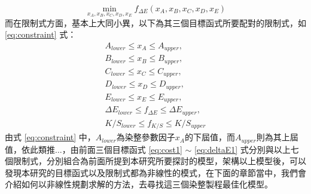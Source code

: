 \begin{equation}
	\min_{x_A,x_B,x_C,x_D,x_E} f_{\Delta E}(x_A,x_B,x_C,x_D,x_E)
\label{eq:deltaE1}
\end{equation}
而在限制式方面，基本上大同小異，以下為其三個目標函式所要配對的限制式，如 \ref{eq:constraint} 式：
\begin{equation}
	\begin{array}{c}
	A_{lower} \leq x_A \leq A_{upper},\\
	B_{lower} \leq x_B \leq B_{upper},\\
	C_{lower} \leq x_C \leq C_{upper},\\
	D_{lower} \leq x_D \leq D_{upper},\\
	E_{lower} \leq x_E \leq E_{upper},\\
	\Delta E_{lower} \leq f_{\Delta E} \leq \Delta E_{upper},\\
	K/S_{lower} \leq f_{K/S} \leq K/S_{upper}
	\end{array}
\label{eq:constraint}
\end{equation}
由式 \ref{eq:constraint} 中，$A_{lower}$為染整參數因子$x_A$的下屆值，而$A_{upper}$則為其上屆值，依此類推$\dots$，由前面三個目標函式 \ref{eq:cost1} $
\sim$ \ref{eq:deltaE1} 式分別與以上七個限制式，分別組合為前面所提到本研究所要探討的模型，架構以上模型後，可以發現本研究的目標函式以及限制式都為非線性的模式，在下面的章節當中，我們會介紹如何以非線性規劃求解的方法，去尋找這三個染整製程最佳化模型。